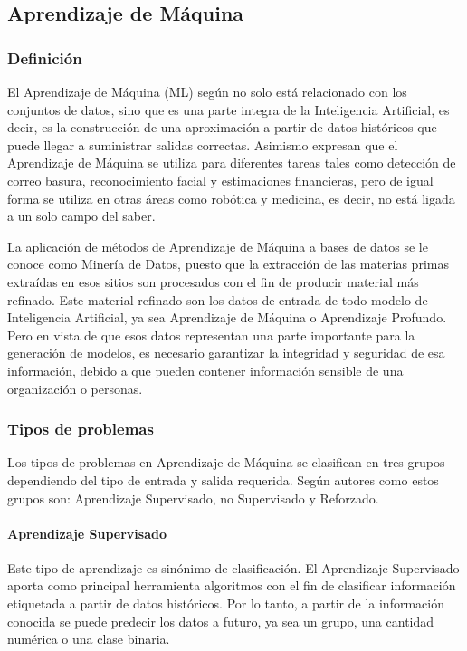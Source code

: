 \subsection{Aprendizaje de Máquina}
\subsubsection{Definición}
El Aprendizaje de Máquina (ML) según \textcite{Ethem2014} no solo está relacionado con los conjuntos de datos, sino que es una parte integra de la Inteligencia Artificial, es decir, es la construcción de una aproximación a partir de datos históricos que puede llegar a suministrar salidas correctas. Asimismo \textcite{Bost2015} expresan que el Aprendizaje de Máquina se utiliza para diferentes tareas tales como detección de correo basura, reconocimiento facial y estimaciones financieras, pero de igual forma se utiliza en otras áreas como robótica y medicina, es decir, no está ligada a un solo campo del saber.

La aplicación de métodos de Aprendizaje de Máquina a bases de datos se le conoce como Minería de Datos, puesto que la extracción de las materias primas extraídas en esos sitios son procesados con el fin de producir material más refinado. Este material refinado son los datos de entrada de todo modelo de Inteligencia Artificial, ya sea Aprendizaje de Máquina o Aprendizaje Profundo. Pero en vista de que esos datos representan una parte importante para la generación de modelos, es necesario garantizar la integridad y seguridad de esa información, debido a que pueden contener información sensible de una organización o personas.

\subsubsection{Tipos de problemas}
Los tipos de problemas en Aprendizaje de Máquina se clasifican en tres grupos dependiendo del tipo de entrada y salida requerida. Según autores como \textcite{Russell2003, Han2012, raschka2015python} estos grupos son: Aprendizaje Supervisado, no Supervisado y Reforzado.

\paragraph{Aprendizaje Supervisado} Este tipo de aprendizaje es sinónimo de clasificación. El Aprendizaje Supervisado aporta como principal herramienta algoritmos con el fin de clasificar información etiquetada a partir de datos históricos. Por lo tanto, a partir de la información conocida se puede predecir los datos a futuro, ya sea un grupo, una cantidad numérica o una clase binaria.

